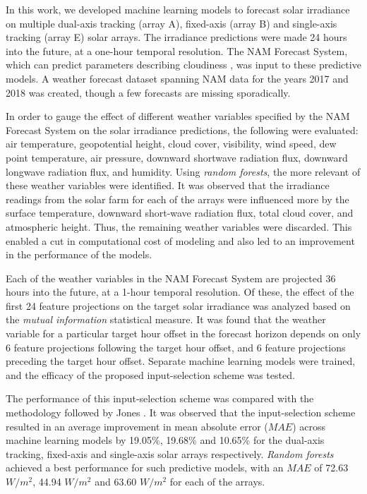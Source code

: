\par In this work, we developed machine learning models to forecast solar irradiance on multiple dual-axis tracking (array A), fixed-axis (array B) and single-axis tracking (array E) solar arrays. The irradiance predictions were made 24 hours into the future, at a one-hour temporal resolution. The NAM Forecast System, which can predict parameters describing cloudiness \cite{multimodel_nam}, was input to these predictive models. A weather forecast dataset spanning NAM data for the years 2017 and 2018 was created, though a few forecasts are missing sporadically. 

\par In order to gauge the effect of different weather variables specified by the NAM Forecast System on the solar irradiance predictions, the following were evaluated: air temperature, geopotential height, cloud cover, visibility, wind speed, dew point temperature, air pressure, downward shortwave radiation flux, downward longwave radiation flux, and humidity. Using \textit{random forests}, the more relevant of these weather variables were identified. It was observed that the irradiance readings from the solar farm for each of the arrays were influenced more by the surface temperature, downward short-wave radiation flux, total cloud cover, and atmospheric height. Thus, the remaining weather variables were discarded. This enabled a cut in computational cost of modeling and also led to an improvement in the performance of the models.

\par Each of the weather variables in the NAM Forecast System are projected 36 hours into the future, at a 1-hour temporal resolution. Of these, the effect of the first 24 feature projections on the target solar irradiance was analyzed based on the \textit{mutual information} statistical measure. It was found that the weather variable for a particular target hour offset in the forecast horizon depends on only 6 feature projections following the target hour offset, and 6 feature projections preceding the target hour offset. Separate machine learning models were trained, and the efficacy of the proposed input-selection scheme was tested. 

\par The performance of this input-selection scheme was compared with the methodology followed by Jones \cite{thesis_zach}. It was observed that the input-selection scheme resulted in an average improvement in mean absolute error ($MAE$) across machine learning models by 19.05\%, 19.68\% and 10.65\% for the dual-axis tracking, fixed-axis and single-axis solar arrays respectively. \textit{Random forests} achieved a best performance for such predictive models, with an $MAE$ of 72.63 $W/m^2$, 44.94 $W/m^2$ and 63.60 $W/m^2$ for each of the arrays.

